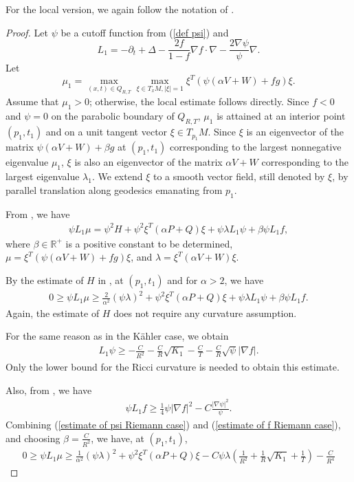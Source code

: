 \documentclass{amsart}
\theoremstyle{definition}
\theoremstyle{remark}
\numberwithin{equation}{section}
\begin{document}
For the local version, we again follow the notation of \cite{Han-Zhang}. 
\begin{proof}
Let $\psi$ be a cutoff function from (\ref{def psi})  and 
$$
L_{1}=-\partial_{t}+\Delta -\frac{2f}{1-f}\nabla f\cdot \nabla -\frac{2\nabla \psi}{\psi}\nabla.
$$
Let  
$$
\mu_1=\max_{(x,t)\in Q_{R,T}}\max_{\xi\in T_x M,|\xi|=1}\xi^T (\psi(\alpha V+W)+fg)\xi.
$$ 
Assume that $\mu_1>0$; otherwise, the local estimate follows directly. Since $f<0$ and $\psi=0$ on the parabolic boundary of $Q_{R,T}$, $\mu_1$ is attained at an interior point $(p_1,t_1)$ and on a unit tangent vector $\xi\in T_{p_1}M$. Since $\xi$ is an eigenvector of the matrix $\psi(\alpha V+W)+\beta g$ at $(p_1,t_1)$ corresponding to the largest nonnegative eigenvalue $\mu_1$, $\xi$ is also an eigenvector of the matrix $\alpha V+W$ corresponding to the largest eigenvalue $\lambda_1$. We extend $\xi$ to a smooth vector field, still denoted by $\xi$, by parallel translation along geodesics emanating from $p_1$.

From \cite{Han-Zhang}, we have 
\begin{align}\label{local equation 1}
\psi L_{1}\mu=\psi^{2}H+\psi^{2}\xi^{T}(\alpha P+Q)\xi+\psi\lambda L_{1}\psi+\beta \psi L_{1}f,
\end{align}
where $\beta\in \mathbb{R}^{+}$ is a positive constant to be determined, $\mu=\xi^T(\psi(\alpha V+W)+fg)\xi$, and
$\lambda=\xi^{T}(\alpha V+W)\xi$.

By the estimate of $H$ in \cite{Han-Zhang}, at $(p_1,t_1)$ and for $\alpha>2$, we have
\begin{align}\label{local version 2}
0\geq \psi L_{1}\mu \geq \frac{2}{\alpha^{2}}(\psi \lambda)^{2}+\psi^{2}\xi^{T}(\alpha P+Q)\xi+\psi \lambda L_{1}\psi+\beta \psi L_{1}f.
\end{align}
Again, the estimate of $H$ does not require any curvature assumption.

For the same reason as in the K\"ahler case, we obtain 
\begin{align}\label{estimate of psi Riemann case}
L_{1}\psi\geq -\frac{C}{R^{2}}-\frac{C}{R}\sqrt{K_1}-\frac{C}{T}-\frac{C}{R}\sqrt{\psi} |\nabla f|.
\end{align}
Only the lower bound for the Ricci curvature is needed to obtain this estimate.

Also, from \cite{Han-Zhang}, we have 
\begin{align}\label{estimate of f Riemann case}
\psi L_{1}f\geq \frac{1}{4}\psi |\nabla f|^{2}-C\frac{|\nabla \psi|^{2}}{\psi}.
\end{align}
Combining (\ref{estimate of psi Riemann case}) and (\ref{estimate of f Riemann case}), and choosing $\beta=\frac{C}{R^{2}}$, we have, at $(p_1,t_1)$, 
\begin{align}\label{LU 2}
0\geq \psi L_{1}\mu \geq \frac{1}{\alpha^{2}}(\psi \lambda)^{2}+\psi^{2}\xi^{T}(\alpha P+Q)\xi-C\psi \lambda(\frac{1}{R^2}+\frac{1}{R}\sqrt{K_1}+\frac{1}{T})-\frac{C}{R^4}
\end{align}


\end{proof}
\end{document}

